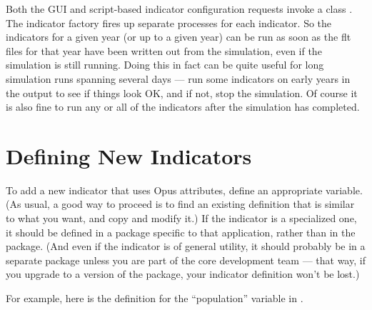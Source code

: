 Both the GUI and script-based indicator configuration requests invoke a
class .  The indicator factory fires up separate
processes for each indicator.  So the indicators \indicatorsindex for a
given year (or up to a given year) can be run as soon as the flt files for
that year have been written out from the simulation, even if the simulation
is still running.  Doing this in fact can be quite useful for long
simulation runs spanning several days --- run some indicators
\indicatorsindex on early years in the output to see if things look OK, and
if not, stop the simulation.  Of course it is also fine to run any or all
of the indicators \indicatorsindex after the simulation has completed.

\section{Defining New Indicators}
\indicatorsindex\attributesindex

To add a new indicator \indicatorsindex that uses Opus attributes,
\attributesindex define an appropriate variable. \variablesindex (As usual,
a good way to proceed is to find an existing definition that is similar to
what you want, and copy and modify it.)  If the indicator \indicatorsindex
is a specialized one, it should be defined in a package specific to that
application, rather than in the  package.  (And even if
the indicator \indicatorsindex is of general utility, it should probably be
in a separate package unless you are part of the core development team ---
that way, if you upgrade to a version of the  package,
your indicator \indicatorsindex definition won't be lost.)

For example, here is the definition for the ``population'' variable
\variablesindex in .

